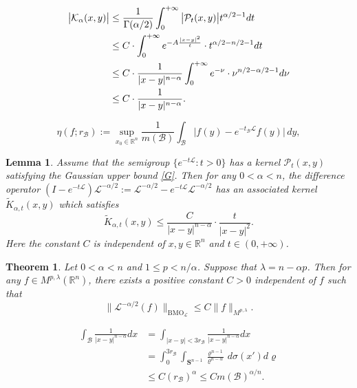 \documentclass[10pt,a4paper]{amsart}
\newtheorem{lemma}{Lemma}
\newtheorem{theorem}{Theorem}
\begin{document}
\begin{align}\label{kernelk}
\big|\mathcal K_{\alpha}(x,y)\big|
&\leq\frac{1}{\Gamma(\alpha/2)}\int_0^{+\infty}\big|\mathcal{P}_t(x,y)\big|t^{\alpha/2-1}dt\notag\\
&\leq C\cdot\int_0^{+\infty} e^{-A\frac{|x-y|^2}{t}}\cdot t^{\alpha/2-n/2-1}dt\notag\\
&\leq C\cdot\frac{1}{|x-y|^{n-\alpha}}\int_0^{+\infty} e^{-\nu}\cdot\nu^{n/2-\alpha/2-1}d\nu\notag\\
&\leq C\cdot\frac{1}{|x-y|^{n-\alpha}}.
\end{align}

\begin{equation}\label{modulus}
\eta(f;r_{\mathcal{B}}):=\sup_{x_0\in\mathbb R^n}\frac{1}{m(\mathcal{B})}
\int_{\mathcal{B}}\big|f(y)-e^{-t_{\mathcal{B}}\mathcal{L}}f(y)\big|\,dy,
\end{equation}

\begin{lemma}\label{wanglemma2}
Assume that the semigroup $\big\{e^{-t\mathcal L}:t>0\big\}$ has a kernel $\mathcal{P}_t(x,y)$ satisfying the Gaussian upper bound \eqref{G}.
Then for any $0<\alpha<n$, the difference operator $(I-e^{-t\mathcal L})\mathcal{L}^{-\alpha/2}:=\mathcal{L}^{-\alpha/2}-e^{-t\mathcal L}\mathcal{L}^{-\alpha/2}$ has an associated kernel $\widetilde{K}_{\alpha,t}(x,y)$ which satisfies
\begin{equation*}
\widetilde{K}_{\alpha,t}(x,y)\leq\frac{C}{|x-y|^{n-\alpha}}\cdot\frac{t}{|x-y|^2}.
\end{equation*}
Here the constant $C$ is independent of $x,y\in\mathbb R^n$ and $t\in(0,+\infty)$.
\end{lemma}

\begin{theorem}\label{thm1}
Let $0<\alpha< n$ and $1\leq p<n/{\alpha}$. Suppose that $\lambda=n-\alpha p$. Then for any $f\in{M}^{p,\lambda}(\mathbb R^n)$, there exists a positive constant $C>0$ independent of $f$ such that
\begin{equation*}
\big\|\mathcal L^{-\alpha/2}(f)\big\|_{\mathrm{BMO}_{\mathcal{L}}}
\leq C\big\|f\big\|_{{M}^{p,\lambda}}.
\end{equation*}
\end{theorem}

\begin{equation}\label{wang1}
\begin{split}
\int_{\mathcal{B}}\frac{1}{|x-y|^{n-\alpha}}dx&=\int_{|x-y|<3r_{\mathcal{B}}}\frac{1}{|x-y|^{n-\alpha}}dx\\
&=\int_0^{3r_{\mathcal{B}}}\int_{\mathbf{S}^{n-1}}\frac{\varrho^{n-1}}{\varrho^{n-\alpha}}\,d\sigma(x')d\varrho\\
&\leq C(r_{\mathcal{B}})^{\alpha}\leq Cm(\mathcal{B})^{\alpha/n}.
\end{split}
\end{equation}
\end{document}
